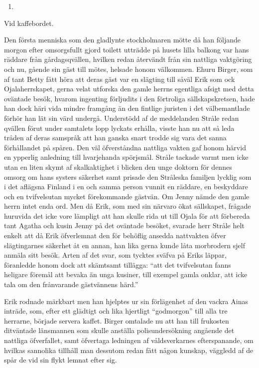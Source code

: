 \begin{enumerate}
\def\labelenumi{\arabic{enumi}.}
\setcounter{enumi}{20}
\tightlist
\item
\end{enumerate}

Vid kaffebordet.

Den första menniska som den gladlynte stockholmaren mötte då han
följande morgon efter omsorgsfullt gjord toilett utträdde på husets
lilla balkong var hans räddare från gårdagsqvällen, hvilken redan
återvändt från sin nattliga vaktgöring och nu, gående sin gäst till
mötes, helsade honom välkommen. Ehuru Birger, som af tant Betty fått
höra att deras gäst var en slägting till såväl Erik som ock
Ojalaherrskapet, gerna velat utforska den gamle herrns egentliga afsigt
med detta oväntade besök, hvarom ingenting förljudits i den förtroliga
sällskapskretsen, hade han dock häri vida mindre framgång än den
fintlige juristen i det välbemantlade förhör han lät sin värd undergå.
Understödd af de meddelanden Stråle redan qvällen förut under samtalets
lopp lyckats erhålla, visste han nu att så leda tråden af deras samspråk
att han ganska snart trodde sig vara det sanna förhållandet på spåren.
Den väl öfverståndna nattliga vakten gaf honom härvid en ypperlig
anledning till hvarjehanda spörjsmål. Stråle tackade varmt men icke utan
en liten skymt af skalkaktighet i blicken den unge doktorn för dennes
omsorg om hans systers säkerhet samt prisade den Stråleska familjen
lycklig som i det aflägsna Finland i en och samma person vunnit en
räddare, en beskyddare och en tvifvelsutan mycket förekommande gästvän.
Om Jenny nämde den gamle herrn intet enda ord. Men då Erik, som med sin
närvaro ökat sällskapet, frågade huruvida det icke vore lämpligt att han
skulle rida ut till Ojala för att förbereda tant Agatha och kusin Jenny
på det oväntade besöket, svarade herr Stråle helt enkelt att då Erik
öfverlemnat den för behöflig ansedda nattvakten öfver slägtingarnes
säkerhet åt en annan, han lika gerna kunde låta morbrodern sjelf anmäla
sitt besök. Arten af det svar, som tycktes sväfva på Eriks läppar,
föranledde honom dock att skämtsamt tillägga: ``att det tvifvelsutan
fanns heligare föremål att bevaka än unga kusiner, till exempel gamla
onklar, att icke tala om den frånvarande gästvännens härd.''

Erik rodnade märkbart men han hjelptes ur sin förlägenhet af den vackra
Ainas inträde, som, efter ett glädtigt och lika hjertligt ``godmorgon''
till alla tre herrarne, började servera kaffet. Birger omtalade nu att
han till frukosten ditväntade länsmannen som skulle anställa
polisundersökning angående det nattliga öfverfallet, samt öfvertaga
ledningen af våldsverkarnes efterspanande, om hvilkas sannolika tillhåll
man dessutom redan fått någon kunskap, väggledd af de spår de vid sin
flykt lemnat efter sig.

